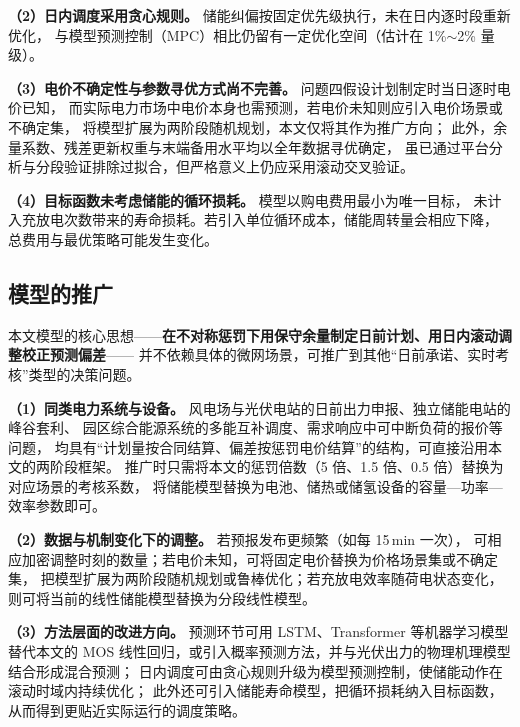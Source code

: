 \textbf{（2）日内调度采用贪心规则。} 储能纠偏按固定优先级执行，未在日内逐时段重新优化，
与模型预测控制（MPC）\cite{mayne2000}相比仍留有一定优化空间（估计在 1\%$\sim$2\% 量级）。

\textbf{（3）电价不确定性与参数寻优方式尚不完善。} 问题四假设计划制定时当日逐时电价已知，
而实际电力市场中电价本身也需预测，若电价未知则应引入电价场景或不确定集，
将模型扩展为两阶段随机规划，本文仅将其作为推广方向；
此外，余量系数、残差更新权重与末端备用水平均以全年数据寻优确定，
虽已通过平台分析与分段验证排除过拟合，但严格意义上仍应采用滚动交叉验证。

\textbf{（4）目标函数未考虑储能的循环损耗。} 模型以购电费用最小为唯一目标，
未计入充放电次数带来的寿命损耗。若引入单位循环成本，储能周转量会相应下降，
总费用与最优策略可能发生变化。

\subsection{模型的推广}

本文模型的核心思想——\textbf{在不对称惩罚下用保守余量制定日前计划、用日内滚动调整校正预测偏差}——
并不依赖具体的微网场景，可推广到其他“日前承诺、实时考核”类型的决策问题。

\textbf{（1）同类电力系统与设备。} 风电场与光伏电站的日前出力申报、独立储能电站的峰谷套利、
园区综合能源系统的多能互补调度、需求响应中可中断负荷的报价等问题，
均具有“计划量按合同结算、偏差按惩罚电价结算”的结构，可直接沿用本文的两阶段框架。
推广时只需将本文的惩罚倍数（5 倍、1.5 倍、0.5 倍）替换为对应场景的考核系数，
将储能模型替换为电池、储热或储氢设备的容量—功率—效率参数即可。

\textbf{（2）数据与机制变化下的调整。} 若预报发布更频繁（如每 15\,min 一次），
可相应加密调整时刻的数量；若电价未知，可将固定电价替换为价格场景集或不确定集，
把模型扩展为两阶段随机规划或鲁棒优化；若充放电效率随荷电状态变化，
则可将当前的线性储能模型替换为分段线性模型。

\textbf{（3）方法层面的改进方向。} 预测环节可用 LSTM、Transformer 等机器学习模型
替代本文的 MOS 线性回归，或引入概率预测方法\cite{hong2016}，并与光伏出力的物理机理模型结合形成混合预测；
日内调度可由贪心规则升级为模型预测控制，使储能动作在滚动时域内持续优化；
此外还可引入储能寿命模型，把循环损耗纳入目标函数，从而得到更贴近实际运行的调度策略。
